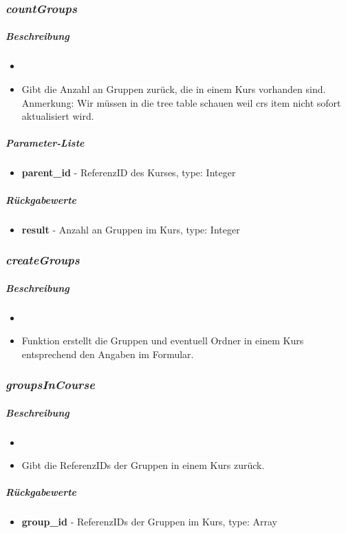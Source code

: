 \subsubsection*{\textit{countGroups}}\label{countGroupsGGUI}
\subparagraph{Beschreibung}
\begin{itemize}
	\item[] \noindent{}
	\item[] Gibt die Anzahl an Gruppen zurück, die in einem Kurs vorhanden sind. Anmerkung: Wir müssen in die tree table schauen weil crs item nicht sofort aktualisiert wird.
\end{itemize}
\subparagraph{Parameter-Liste}
\begin{itemize}
	\item[] \textbf{parent\_id} - ReferenzID des Kurses, type: Integer
\end{itemize}
\subparagraph{Rückgabewerte}
\begin{itemize}
	\item[] \textbf{result} - Anzahl an Gruppen im Kurs, type: Integer
\end{itemize}

\subsubsection*{\textit{createGroups}}\label{createGroupsGGUI}
\subparagraph{Beschreibung}
\begin{itemize}
	\item[] \noindent{}
	\item[] Funktion erstellt die Gruppen und eventuell Ordner in einem Kurs entsprechend den Angaben im Formular. 
\end{itemize}

\subsubsection*{\textit{groupsInCourse}}\label{groupsInCourseGGUI}
\subparagraph{Beschreibung}
\begin{itemize}
	\item[] \noindent{}
	\item[] Gibt die ReferenzIDs der Gruppen in einem Kurs zurück.
\end{itemize}
\subparagraph{Rückgabewerte}
\begin{itemize}
	\item[] \textbf{group\_id} - ReferenzIDs der Gruppen im Kurs, type: Array
\end{itemize}

